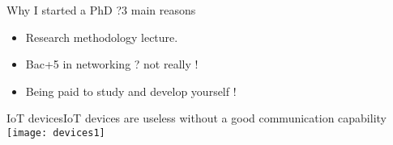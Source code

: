 
\begin{frame}{Why I started a PhD ?}{3 main reasons}
	\begin{itemize}
		\item Research methodology lecture.
		\item Bac+5 in networking ? not really !
		\item Being paid to study and develop yourself !
	\end{itemize}
\end{frame}


\begin{frame}{IoT devices}{IoT devices are useless without a good communication capability}
	\centering
	\texttt{[image: devices1]}
\end{frame}

